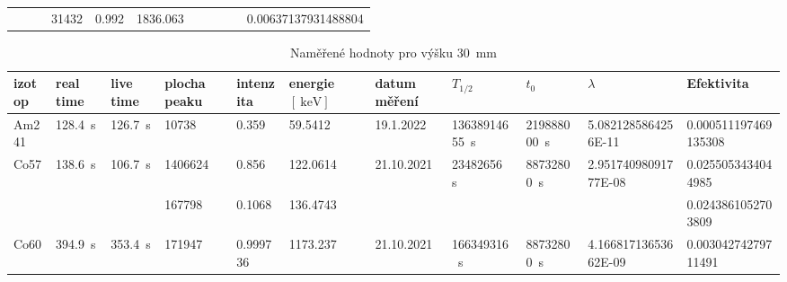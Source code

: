 \documentclass[12pt,a4paper]{article}
\begin{document}
\begin{spacing}{1.5}
\begin{landscape}
\begin{table}[]
\begin{tabular}{l|l|l|l|l|l|l|l|l|l|l}
                      &                          			   &				                        & \num{31432}        & \num{0.992}     & \num{1836.063}    					  &                             &                            				&                           			  &                                       		& \num{0.00637137931488804} \\
\end{tabular}
\end{table}
\begin{table}
	\caption{Naměřené hodnoty pro výšku \SI{30}{\milli\meter}}
	\vspace*{2mm}
	\hspace*{-2cm}
	\begin{tabular}{l|l|l|l|l|l|l|l|l|l|l}
	\hline
		izotop                & real time                			   & live time                				& plocha peaku 		 & intenzita	   & energie $ [\SI{}{\kilo\electronvolt}] $& datum měření                & $ T_{1/2}  $                 			    & $t_0$                        			  & $\lambda$                                		& Efektivita                \\ \hline
		Am241                 & \SI{128.4}{\second}                     & \SI{126.7}{\second}                     & \num{10738}        & \num{0.359}     & \num{59.5412}      				  & 19.1.2022                   & \SI{13638914655}{\second}                & \SI{219888000}{\second}                 & \num{5.0821285864256E-11}                   & \num{0.000511197469135308}  \\ \hline
		\multirow{2}{*}{Co57} & \multirow{2}{*}{\SI{138.6}{\second}}      & \multirow{2}{*}{\SI{106.7}{\second}}    & \num{1406624}      & \num{0.856}     & \num{122.0614}     				  & \multirow{2}{*}{21.10.2021} & \multirow{2}{*}{\SI{23482656}{\second}}  & \multirow{2}{*}{\SI{88732800}{\second}} & \multirow{2}{*}{\num{2.95174098091777E-08}} & \num{0.0255053434044985}  \\  
		&                         			   							&                         				& \num{167798}       & \num{0.1068}    & \num{136.4743}     				  &                             &                            				&                           			  &                                       		& \num{0.0243861052703809}  \\ \hline
		\multirow{2}{*}{Co60} & \multirow{2}{*}{\SI{394.9}{\second}}    & \multirow{2}{*}{\SI{353.4}{\second}}   & \num{171947}       & \num{0.999736}  & \num{1173.237}     				  & \multirow{2}{*}{21.10.2021} & \multirow{2}{*}{\SI{166349316}{\second}} & \multirow{2}{*}{\SI{88732800}{\second}} & \multirow{2}{*}{\num{4.16681713653662E-09}} & \num{0.00304274279711491}  \\  

\end{tabular}
\end{table}
\end{landscape}
\end{spacing}
\end{document}
